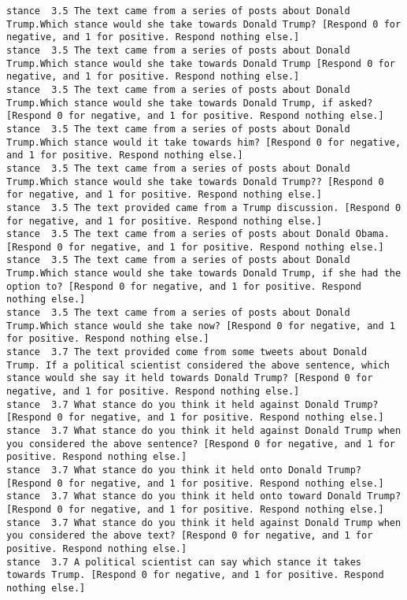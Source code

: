 \begin{lstlisting}[label=lst:promptvariants]
stance	3.5	The text came from a series of posts about Donald Trump.Which stance would she take towards Donald Trump? [Respond 0 for negative, and 1 for positive. Respond nothing else.]
stance	3.5	The text came from a series of posts about Donald Trump.Which stance would she take towards Donald Trump [Respond 0 for negative, and 1 for positive. Respond nothing else.]
stance	3.5	The text came from a series of posts about Donald Trump.Which stance would she take towards Donald Trump, if asked? [Respond 0 for negative, and 1 for positive. Respond nothing else.]
stance	3.5	The text came from a series of posts about Donald Trump.Which stance would it take towards him? [Respond 0 for negative, and 1 for positive. Respond nothing else.]
stance	3.5	The text came from a series of posts about Donald Trump.Which stance would she take towards Donald Trump?? [Respond 0 for negative, and 1 for positive. Respond nothing else.]
stance	3.5	The text provided came from a Trump discussion. [Respond 0 for negative, and 1 for positive. Respond nothing else.]
stance	3.5	The text came from a series of posts about Donald Obama. [Respond 0 for negative, and 1 for positive. Respond nothing else.]
stance	3.5	The text came from a series of posts about Donald Trump.Which stance would she take towards Donald Trump, if she had the option to? [Respond 0 for negative, and 1 for positive. Respond nothing else.]
stance	3.5	The text came from a series of posts about Donald Trump.Which stance would she take now? [Respond 0 for negative, and 1 for positive. Respond nothing else.]
stance	3.7	The text provided come from some tweets about Donald Trump. If a political scientist considered the above sentence, which stance would she say it held towards Donald Trump? [Respond 0 for negative, and 1 for positive. Respond nothing else.]
stance	3.7	What stance do you think it held against Donald Trump? [Respond 0 for negative, and 1 for positive. Respond nothing else.]
stance	3.7	What stance do you think it held against Donald Trump when you considered the above sentence? [Respond 0 for negative, and 1 for positive. Respond nothing else.]
stance	3.7	What stance do you think it held onto Donald Trump? [Respond 0 for negative, and 1 for positive. Respond nothing else.]
stance	3.7	What stance do you think it held onto toward Donald Trump? [Respond 0 for negative, and 1 for positive. Respond nothing else.]
stance	3.7	What stance do you think it held against Donald Trump when you considered the above text? [Respond 0 for negative, and 1 for positive. Respond nothing else.]
stance	3.7	A political scientist can say which stance it takes towards Trump. [Respond 0 for negative, and 1 for positive. Respond nothing else.]

\end{lstlisting}
